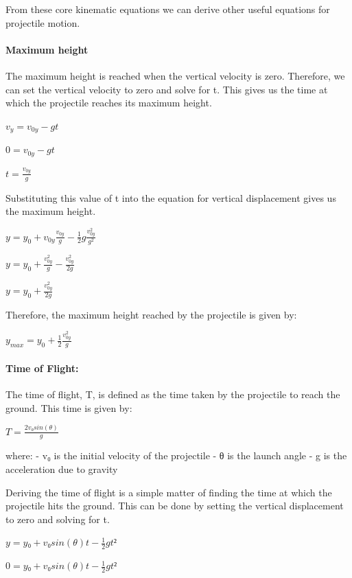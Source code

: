 \documentclass[11pt]{article}
\begin{document}
From these core kinematic equations we can derive other useful equations
for projectile motion.

    \hypertarget{maximum-height}{%
\paragraph{\texorpdfstring{\textbf{Maximum
height}}{Maximum height}}\label{maximum-height}}

The maximum height is reached when the vertical velocity is zero.
Therefore, we can set the vertical velocity to zero and solve for t.
This gives us the time at which the projectile reaches its maximum
height.

\(v_y = v_{0y} - g t\)

\(0 = v_{0y} - g t\)

\(t = \frac{v_{0y}}{g}\)

Substituting this value of t into the equation for vertical displacement
gives us the maximum height.

\(y = y_0 + v_{0y} \frac{v_{0y}}{g} - \frac{1}{2} g \frac{v_{0y}^2}{g^2}\)

\(y = y_0 + \frac{v_{0y}^2}{g} - \frac{v_{0y}^2}{2g}\)

\(y = y_0 + \frac{v_{0y}^2}{2g}\)

Therefore, the maximum height reached by the projectile is given by:

\(y_{max} = y_0 + \frac{1}{2} \frac{v_{0y}^2}{g}\)

    \hypertarget{time-of-flight}{%
\paragraph{\texorpdfstring{\textbf{Time of
Flight:}}{Time of Flight:}}\label{time-of-flight}}

The time of flight, T, is defined as the time taken by the projectile to
reach the ground. This time is given by:

\(T = \frac{2v₀ sin(θ)}{g}\)

where: - v₀ is the initial velocity of the projectile - θ is the launch
angle - g is the acceleration due to gravity

Deriving the time of flight is a simple matter of finding the time at
which the projectile hits the ground. This can be done by setting the
vertical displacement to zero and solving for t.

\(y = y₀ + v₀ sin(θ) t - \frac{1}{2} g t²\)

\(0 = y₀ + v₀ sin(θ) t - \frac{1}{2} g t²\)
\end{document}
